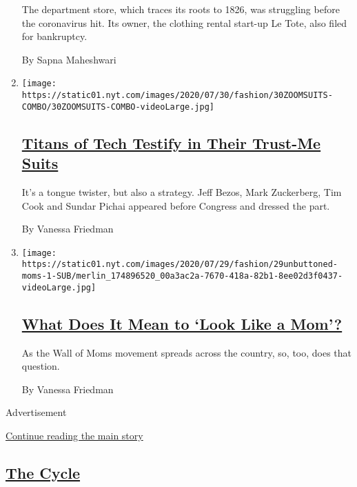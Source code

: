 \begin{enumerate}
  The department store, which traces its roots to 1826, was struggling
  before the coronavirus hit. Its owner, the clothing rental start-up Le
  Tote, also filed for bankruptcy.

  By Sapna Maheshwari
\item
  \texttt{[image: https://static01.nyt.com/images/2020/07/30/fashion/30ZOOMSUITS-COMBO/30ZOOMSUITS-COMBO-videoLarge.jpg]}

  \hypertarget{titans-of-tech-testify-in-their-trust-me-suits}{%
  \subsection{\texorpdfstring{\href{/2020/07/29/style/Bezos-zuckerberg-cook-pichai-testimony-suits.html}{Titans
  of Tech Testify in Their Trust-Me
  Suits}}{Titans of Tech Testify in Their Trust-Me Suits}}\label{titans-of-tech-testify-in-their-trust-me-suits}}

  It's a tongue twister, but also a strategy. Jeff Bezos, Mark
  Zuckerberg, Tim Cook and Sundar Pichai appeared before Congress and
  dressed the part.

  By Vanessa Friedman
\item
  \texttt{[image: https://static01.nyt.com/images/2020/07/29/fashion/29unbuttoned-moms-1-SUB/merlin\_174896520\_00a3ac2a-7670-418a-82b1-8ee02d3f0437-videoLarge.jpg]}

  \hypertarget{what-does-it-mean-to-look-like-a-mom}{%
  \subsection{\texorpdfstring{\href{/2020/07/28/style/wall-of-moms-image.html}{What
  Does It Mean to `Look Like a
  Mom'?}}{What Does It Mean to `Look Like a Mom'?}}\label{what-does-it-mean-to-look-like-a-mom}}

  As the Wall of Moms movement spreads across the country, so, too, does
  that question.

  By Vanessa Friedman
\end{enumerate}

Advertisement

\protect\hyperlink{after-mid5}{Continue reading the main story}

\hypertarget{the-cycle}{%
\subsection{\texorpdfstring{\href{/column/the-cycle}{The
Cycle}}{The Cycle}}\label{the-cycle}}

